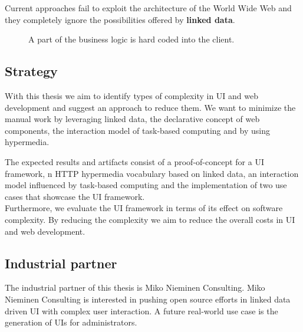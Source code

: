 Current approaches fail to exploit the architecture of the World Wide Web and they completely ignore the possibilities offered by \textbf{linked data}.

\begin{figure}[!htb]
  \caption{A part of the business logic is hard coded into the client.}
  \label{fig:hardcoded}
\end{figure}

\subsection{Strategy}\label{strategy}
With this thesis we aim to identify types of complexity in UI and web development and suggest an approach to reduce them.
We want to minimize the manual work by leveraging linked data, the declarative concept of web components, the interaction model of task-based computing and by using hypermedia.

The expected results and artifacts consist of a proof-of-concept for a UI framework, n HTTP hypermedia vocabulary based on linked data, an interaction model influenced by task-based computing and the implementation of two use cases that showcase the UI framework. \\
Furthermore, we evaluate the UI framework in terms of its effect on software complexity. By reducing the complexity we aim to reduce the overall costs in UI and web development.

\subsection{Industrial partner}
The industrial partner of this thesis is Miko Nieminen Consulting. Miko Nieminen Consulting is interested in pushing open source efforts in linked data driven UI with complex user interaction. A future real-world use case is the generation of UIs for administrators.
